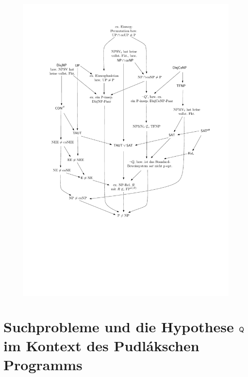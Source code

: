 \begin{figure}
    \sffamily
    \centering\includegraphics[page=6]{figures.pdf}
    \caption{}\label{fig:3col}
\end{figure}



\chapter{Suchprobleme und die Hypothese $\mathsf{Q}$ im Kontext des Pudlákschen Programms}


